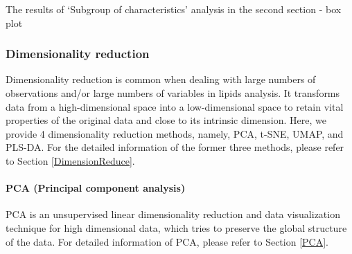 \documentclass[]{article}
\begin{document}
\label{fig:unnamed-chunk-45}The results of `Subgroup of characteristics' analysis in the second section - box plot

\hypertarget{dimensionality-reduction}{%
\subsubsection{Dimensionality reduction}\label{dimensionality-reduction}}

Dimensionality reduction is common when dealing with large numbers of observations and/or large numbers of variables in lipids analysis. It transforms data from a high-dimensional space into a low-dimensional space to retain vital properties of the original data and close to its intrinsic dimension. Here, we provide 4 dimensionality reduction methods, namely, PCA, t-SNE, UMAP, and PLS-DA. For the detailed information of the former three methods, please refer to Section \ref{DimensionReduce}.

\hypertarget{pca-principal-component-analysis-1}{%
\paragraph{PCA (Principal component analysis)}\label{pca-principal-component-analysis-1}}

PCA is an unsupervised linear dimensionality reduction and data visualization technique for high dimensional data, which tries to preserve the global structure of the data. For detailed information of PCA, please refer to Section \ref{PCA}.
\end{document}
